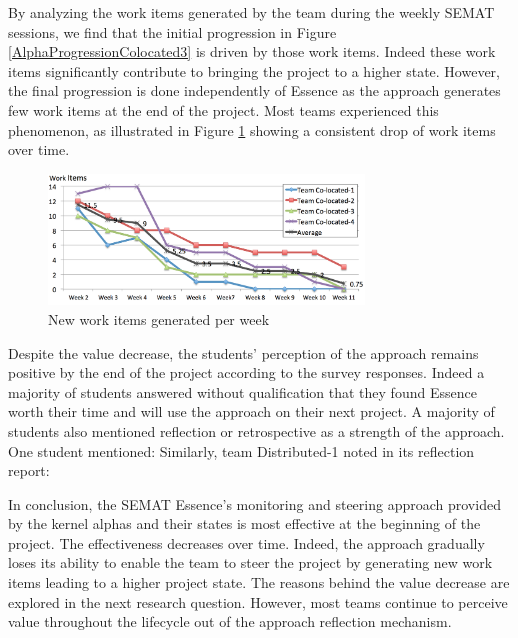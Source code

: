 By analyzing the work items generated by the team during the weekly SEMAT sessions, we find that the initial progression in Figure \ref{AlphaProgressionColocated3} is driven by those work items. Indeed these work items significantly contribute to bringing the project to a higher state. However, the final progression is done independently of Essence as the approach generates few work items at the end of the project. Most teams experienced this phenomenon, as illustrated in Figure \ref{NewWorkItemsGenerated} showing a consistent drop of work items over time.

\begin{figure}[t]
\centering
\includegraphics[width=3.30in]{project_steering_images/NewWorkItemsGenerated.png}
\caption{New work items generated per week}
\label{NewWorkItemsGenerated}
\end{figure}

Despite the value decrease, the students' perception of the approach remains positive by the end of the project according to the survey responses. Indeed a majority of students answered without qualification that they found Essence worth their time and will use the approach on their next project. A majority of students also mentioned reflection or retrospective as a strength of the approach. One student mentioned:  Similarly, team Distributed-1 noted in its reflection report: 

In conclusion, the SEMAT Essence's monitoring and steering approach provided by the kernel alphas and their states is most effective at the beginning of the project. The effectiveness decreases over time. Indeed, the approach gradually loses its ability to enable the team to steer the project by generating new work items leading to a higher project state. The reasons behind the value decrease are explored in the next research question. However, most teams continue to perceive value throughout the lifecycle out of the approach reflection mechanism.

